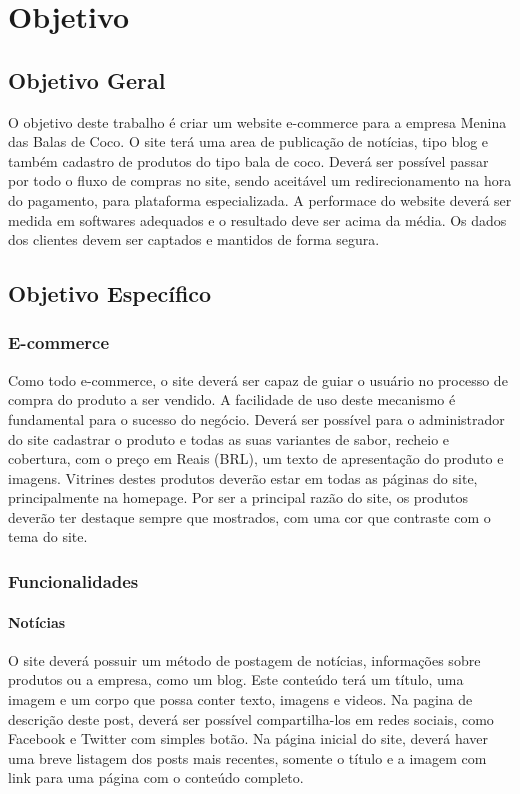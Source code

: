 \chapter{Objetivo}

\section{Objetivo Geral}

O objetivo deste trabalho é criar um website e-commerce para a empresa Menina das Balas de Coco. O site terá uma area de publicação de notícias, tipo blog e também cadastro de produtos do tipo bala de coco. Deverá ser possível passar por todo o fluxo de compras no site, sendo aceitável um redirecionamento na hora do pagamento, para plataforma especializada. A performace do website deverá ser medida em softwares adequados e o resultado deve ser acima da média. Os dados dos clientes devem ser captados e mantidos de forma segura.

\section{Objetivo Específico}

\subsection{E-commerce}

Como todo e-commerce, o site deverá ser capaz de guiar o usuário no processo de compra do produto a ser vendido. A facilidade de uso deste mecanismo é fundamental para o sucesso do negócio. Deverá ser possível para o administrador do site cadastrar o produto e todas as suas variantes de sabor, recheio e cobertura, com o preço em Reais (BRL), um texto de apresentação do produto e imagens. Vitrines destes produtos deverão estar em todas as páginas do site, principalmente na homepage. Por ser a principal razão do site, os produtos deverão ter destaque sempre que mostrados, com uma cor que contraste com o tema do site.

\subsection{Funcionalidades}

\subsubsection{Notícias}
O site deverá possuir um método de postagem de notícias, informações sobre produtos ou a empresa, como um blog.
Este conteúdo terá um título, uma imagem e um corpo que possa conter texto, imagens e videos. Na pagina de descrição deste post, deverá ser possível compartilha-los em redes sociais, como Facebook e Twitter com simples botão. Na página inicial do site, deverá haver uma breve listagem dos posts mais recentes, somente o título e a imagem com link para uma página com o conteúdo completo.

